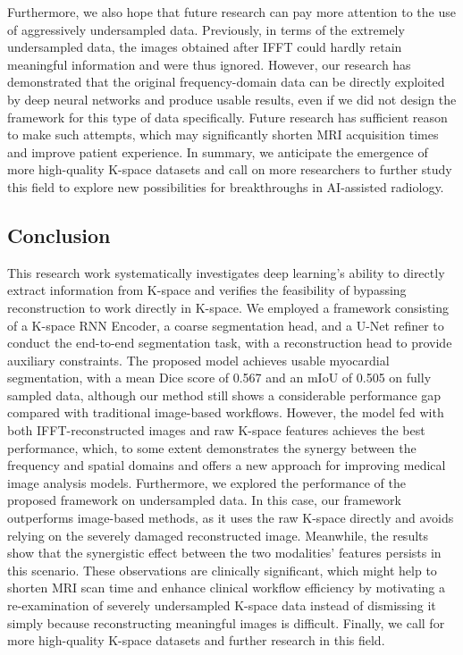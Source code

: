 \documentclass[12pt,a4paper]{article}
\begin{document}
Furthermore, we also hope that future research can pay more attention to the use of aggressively undersampled data. Previously, in terms of the extremely undersampled data, the images obtained after IFFT could hardly retain meaningful information and were thus ignored. However, our research has demonstrated that the original frequency-domain data can be directly exploited by deep neural networks and produce usable results, even if we did not design the framework for this type of data specifically. Future research has sufficient reason to make such attempts, which may significantly shorten MRI acquisition times and improve patient experience. In summary, we anticipate the emergence of more high-quality K-space datasets and call on more researchers to further study this field to explore new possibilities for breakthroughs in AI-assisted radiology.



\subsection{Conclusion}
This research work systematically investigates deep learning’s ability to directly extract information from K-space and verifies the feasibility of bypassing reconstruction to work directly in K-space. We employed a framework consisting of a K-space RNN Encoder, a coarse segmentation head, and a U-Net refiner to conduct the end-to-end segmentation task, with a reconstruction head to provide auxiliary constraints. The proposed model achieves usable myocardial segmentation, with a mean Dice score of 0.567 and an mIoU of 0.505 on fully sampled data, although our method still shows a considerable performance gap compared with traditional image-based workflows. However, the model fed with both IFFT-reconstructed images and raw K-space features achieves the best performance, which, to some extent demonstrates the synergy between the frequency and spatial domains and offers a new approach for improving medical image analysis models. Furthermore, we explored the performance of the proposed framework on undersampled data. In this case, our framework outperforms image-based methods, as it uses the raw K-space directly and avoids relying on the severely damaged reconstructed image. Meanwhile, the results show that the synergistic effect between the two modalities’ features persists in this scenario. These observations are clinically significant, which might help to shorten MRI scan time and enhance clinical workflow efficiency by motivating a re-examination of severely undersampled K-space data instead of dismissing it simply because reconstructing meaningful images is difficult. Finally, we call for more high-quality K-space datasets and further research in this field.
\end{document}
